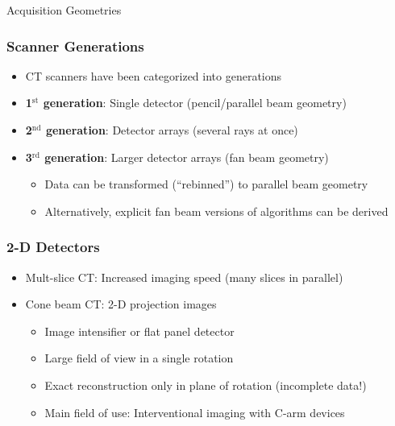 \begin{frame}[c,allowframebreaks]{Acquisition Geometries}
\end{frame}

\begin{frame}
	\frametitle{Scanner Generations}

	\begin{itemize}
		\setlength\itemsep{0.3cm}
		\item CT scanners have been categorized into generations
		\item \textbf{\textcolor{faublue}{1$^\text{st}$ generation}}: Single detector (pencil/parallel beam geometry)
		\item \textbf{\textcolor{faublue}{2$^\text{nd}$ generation}}: Detector arrays (several rays at once)
		\item \textbf{\textcolor{faublue}{3$^\text{rd}$ generation}}: Larger detector arrays (fan beam geometry)
		      \begin{itemize}
			      \item Data can be transformed (``rebinned'') to parallel beam geometry
			      \item Alternatively, explicit fan beam versions of algorithms can be derived
		      \end{itemize}

	\end{itemize}

\end{frame}

\begin{frame}
	\frametitle{2-D Detectors}

	\begin{itemize}
		\setlength\itemsep{0.3cm}
		\item Mult-slice CT: Increased imaging speed (many slices in parallel)
		\item Cone beam CT: 2-D projection images

		      \begin{itemize}
			      \setlength\itemsep{0.1cm}
			      \item Image intensifier or flat panel detector
			      \item Large field of view in a single rotation
			      \item Exact reconstruction only in plane of rotation (incomplete data!)
			      \item Main field of use: Interventional imaging with C-arm devices
		      \end{itemize}

	\end{itemize}

\end{frame}

